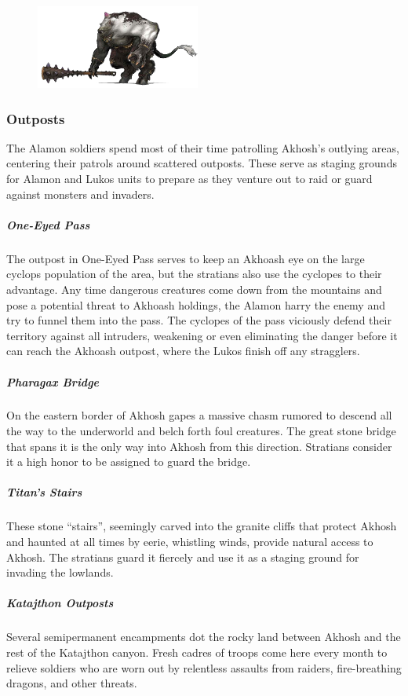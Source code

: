     \begin{figure}[!t]
        \centering
        \includegraphics[width=0.48\textwidth]{02viphoger/img/10cyclops}
    \end{figure}

    \subsubsection{Outposts}
        The Alamon soldiers spend most of their time patrolling Akhosh's outlying areas, centering their patrols around scattered outposts.
        These serve as staging grounds for Alamon and Lukos units to prepare as they venture out to raid or guard against monsters and invaders.

        \subparagraph{One-Eyed Pass} The outpost in One-Eyed Pass serves to keep an Akhoash eye on the large cyclops population of the area, but the stratians also use the cyclopes to their advantage.
        Any time dangerous creatures come down from the mountains and pose a potential threat to Akhoash holdings, the Alamon harry the enemy and try to funnel them into the pass.
        The cyclopes of the pass viciously defend their territory against all intruders, weakening or even eliminating the danger before it can reach the Akhoash outpost, where the Lukos finish off any stragglers.

        \subparagraph{Pharagax Bridge} On the eastern border of Akhosh gapes a massive chasm rumored to descend all the way to the underworld and belch forth foul creatures.
        The great stone bridge that spans it is the only way into Akhosh from this direction.
        Stratians consider it a high honor to be assigned to guard the bridge.

        \subparagraph{Titan's Stairs} These stone ``stairs'', seemingly carved into the granite cliffs that protect Akhosh and haunted at all times by eerie, whistling winds, provide natural access to Akhosh.
        The stratians guard it fiercely and use it as a staging ground for invading the lowlands.

        \subparagraph{Katajthon Outposts} Several semipermanent encampments dot the rocky land between Akhosh and the rest of the Katajthon canyon.
        Fresh cadres of troops come here every month to relieve soldiers who are worn out by relentless assaults from raiders, fire-breathing dragons, and other threats.

